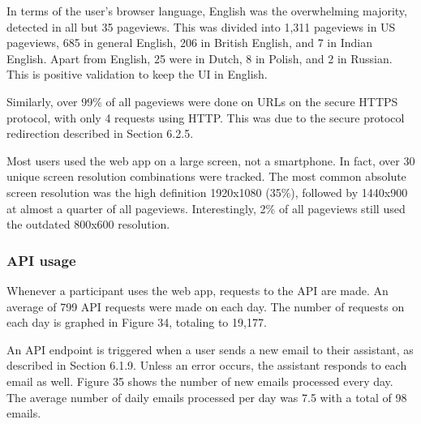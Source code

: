 \documentclass{article}
\begin{document}
In terms of the user's browser language, English was the overwhelming majority, detected in all but 35 pageviews. This was divided into 1,311 pageviews in US pageviews, 685 in general English, 206 in British English, and 7 in Indian English. Apart from English, 25 were in Dutch, 8 in Polish, and 2 in Russian. This is positive validation to keep the UI in English.

Similarly, over 99\% of all pageviews were done on URLs on the secure HTTPS protocol, with only 4 requests using HTTP. This was due to the secure protocol redirection described in Section 6.2.5.

Most users used the web app on a large screen, not a smartphone. In fact, over 30 unique screen resolution combinations were tracked. The most common absolute screen resolution was the high definition 1920x1080 (35\%), followed by 1440x900 at almost a quarter of all pageviews. Interestingly, 2\% of all pageviews still used the outdated 800x600 resolution.

\subsubsection{API usage}

Whenever a participant uses the web app, requests to the API are made. An average of 799 API requests were made on each day. The number of requests on each day is graphed in Figure 34, totaling to 19,177.

An API endpoint is triggered when a user sends a new email to their assistant, as described in Section 6.1.9. Unless an error occurs, the assistant responds to each email as well. Figure 35 shows the number of new emails processed every day. The average number of daily emails processed per day was 7.5 with a total of 98 emails.
\end{document}
